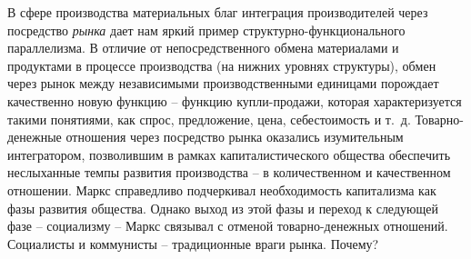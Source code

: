 \documentclass{book}
\begin{document}
В сфере производства материальных благ интеграция произ­водителей через посредство 
\textit{рынка}  дает нам яркий пример струк­турно-функционального параллелизма. В 
отличие от непосред­ственного обмена материалами и продуктами в процессе производства 
(на нижних уровнях структуры), обмен через рынок между независимыми производственными 
единицами порож­дает качественно новую функцию -- функцию купли-продажи, которая 
характеризуется такими понятиями, как спрос, предло­жение, цена, себестоимость и т.~д. 
Товарно-денежные отношения через посредство рынка оказались изумительным 
интегратором, позволившим в рамках капиталистического общества обеспе­чить неслыханные 
темпы развития производства -- в количест­венном и качественном отношении. Маркс 
справедливо под­черкивал необходимость капитализма как фазы развития об­щества. Однако 
выход из этой фазы и переход к следующей фазе -- социализму -- Маркс связывал с 
отменой товарно-де­нежных отношений. Социалисты и коммунисты -- традицион­ные враги 
рынка. Почему?
\end{document}
